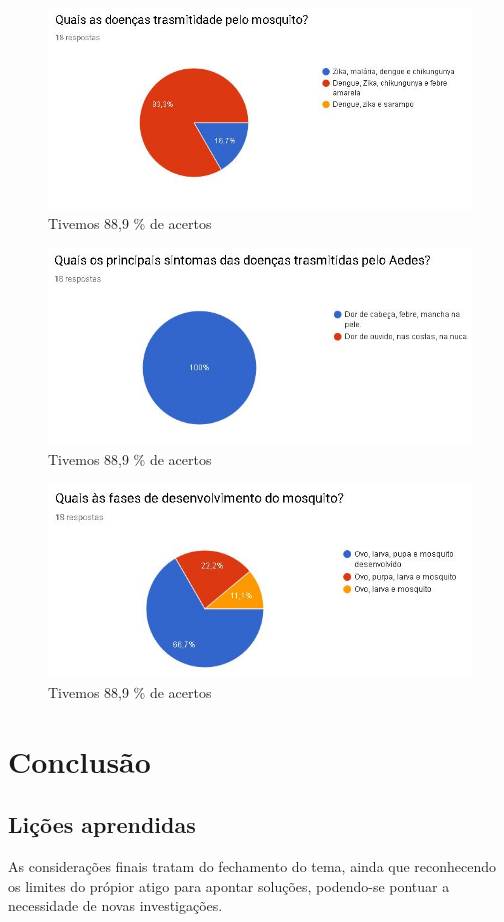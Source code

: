 \documentclass[12pt]{article}
\begin{document}
		\begin{figure}
			\centering
			\caption{Tivemos 88,9 \% de acertos}
			\includegraphics[width=0.7\linewidth]{Figuras/Pergunta_3}
			
			\label{fig:pergunta3}
		\end{figure}
	
		\begin{figure}
			\centering
			\caption{Tivemos 88,9 \% de acertos}
			\includegraphics[width=0.7\linewidth]{Figuras/Pergunta_4}
			
			\label{fig:pergunta4}
		\end{figure}
	
		\begin{figure}
			\centering
			\caption{Tivemos 88,9 \% de acertos}
			\includegraphics[width=0.7\linewidth]{Figuras/Pergunta_5}
			
			\label{fig:pergunta5}
		\end{figure}
	
	
	\section{Conclusão}
	\subsection{Lições aprendidas}
		As considerações finais tratam do fechamento do tema, ainda que reconhecendo os limites do própior atigo para apontar soluções, podendo-se pontuar a necessidade de novas investigações.
	
\end{document}
